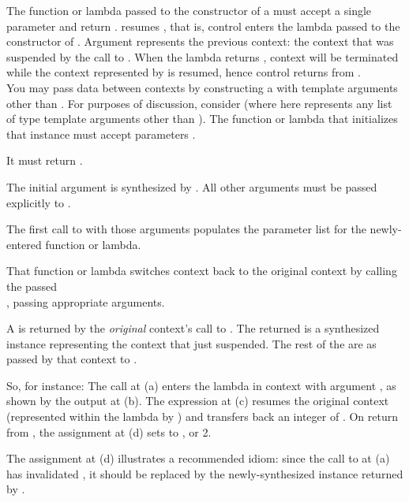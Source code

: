The function or lambda passed to the constructor of
a \ectxvoid must accept a single \ectxvoid parameter and return \ectxvoid.
 resumes , that is, control enters the lambda passed to
the constructor of . Argument  represents the previous
context: the context that was suspended by the call to . When the
lambda returns , context  will be terminated while the
context represented by  is resumed, hence control returns
from .\\


\label{subsec:ectxdata}
You may pass data between contexts by constructing a \ectx with template
arguments other than . For purposes of discussion,
consider \ectxargs (where  here represents any list of type
template arguments other than ). The function or lambda that
initializes that instance must accept parameters \ectxargsargsargs.

It must return .

The initial \ectx argument is synthesized by \op. All other arguments must be
passed explicitly to \op.

The first call to \op with those arguments populates the parameter list for
the newly-entered function or lambda.

That function or lambda switches context back to the original context by
calling the passed\\
\ectxop, passing appropriate arguments.

A \ectxargstup is returned by the \emph{original} context's call to \op. The
returned \ectx is a synthesized instance representing the context that just
suspended. The rest of the  are as passed by that context to \op.

So, for instance:
The  call at (a) enters the lambda in context  with
argument , as shown by the output at (b). The
expression  at (c) resumes the original context (represented
within the lambda by ) and transfers back an integer of .
On return from , the assignment at (d) sets  to ,
or 2.

The assignment at (d) illustrates a recommended idiom: since the call to \op
at (a) has invalidated , it should be replaced by the
newly-synthesized \ectx instance returned by \op.

